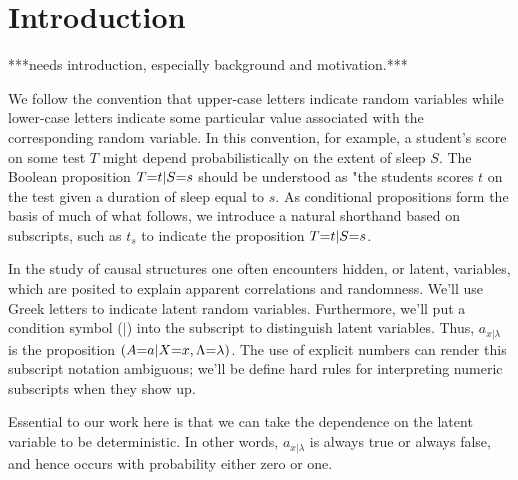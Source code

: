 
\section{Introduction}
***needs introduction, especially background and motivation.***


We follow the convention that upper-case letters indicate random variables while lower-case letters indicate some particular value associated with the corresponding random variable. In this convention, for example, a student's score on some test $T$ might depend probabilistically on the extent of sleep $S$. The Boolean proposition $T\cramp{=}t|S\cramp{=}s$ should be understood as "the students scores $t$ on the test given a duration of sleep equal to $s$. As conditional propositions form the basis of much of what follows, we introduce a natural shorthand based on subscripts, such as $t_s$ to indicate the proposition $T\cramp{=}t|S\cramp{=}s$. 

In the study of causal structures one often encounters hidden, or latent, variables, which are posited to explain apparent correlations and randomness. We'll use Greek letters to indicate latent random variables. Furthermore, we'll put a condition symbol ($|$) into the subscript to distinguish latent variables. Thus, $a_{x|\lambda}$ is the proposition $\parens*{A\cramp{=}a|X\cramp{=}x,\Lambda\cramp{=}\lambda}$. The use of explicit numbers can render this subscript notation ambiguous; we'll be define hard rules for interpreting numeric subscripts when they show up. 

Essential to our work here is that we can take the dependence on the latent variable to be deterministic. In other words,  $a_{x|\lambda}$ is always true or always false, and hence occurs with probability either zero or one. 


